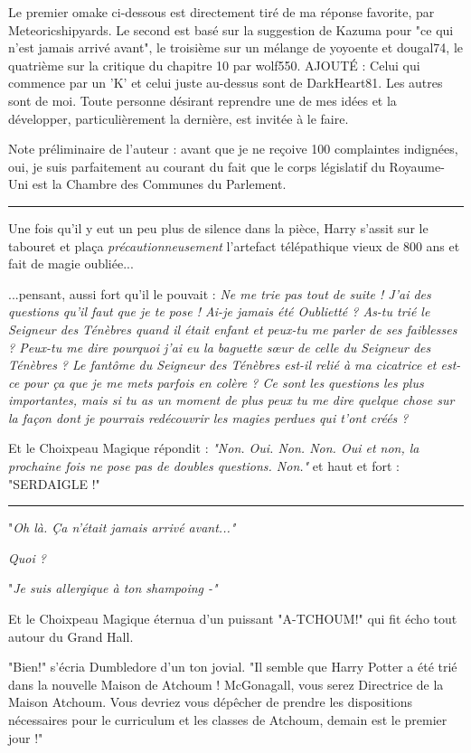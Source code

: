 Le premier omake ci-dessous est directement tiré de ma réponse favorite, par Meteoricshipyards. Le second est basé sur la suggestion de Kazuma pour "ce qui n'est jamais arrivé avant", le troisième sur un mélange de yoyoente et dougal74, le quatrième sur la critique du chapitre 10 par wolf550. AJOUTÉ : Celui qui commence par un 'K' et celui juste au-dessus sont de DarkHeart81. Les autres sont de moi. Toute personne désirant reprendre une de mes idées et la développer, particulièrement la dernière, est invitée à le faire.

Note préliminaire de l'auteur : avant que je ne reçoive 100 complaintes indignées, oui, je suis parfaitement au courant du fait que le corps législatif du Royaume-Uni est la Chambre des Communes du Parlement.
\par\noindent\rule{\textwidth}{0.4pt}
Une fois qu'il y eut un peu plus de silence dans la pièce, Harry s'assit sur le tabouret et plaça \emph{précautionneusement}  l'artefact télépathique vieux de 800 ans et fait de magie oubliée...

...pensant, aussi fort qu'il le pouvait : \emph{Ne me trie pas tout de suite ! J'ai des questions qu'il faut que je te pose ! Ai-je jamais été Oublietté ? As-tu trié le Seigneur des Ténèbres quand il était enfant et peux-tu me parler de ses faiblesses ? Peux-tu me dire pourquoi j'ai eu la baguette sœur de celle du Seigneur des Ténèbres ? Le fantôme du Seigneur des Ténèbres est-il relié à ma cicatrice et est-ce pour ça que je me mets parfois en colère ? Ce sont les questions les plus importantes, mais si tu as un moment de plus peux tu me dire quelque chose sur la façon dont je pourrais redécouvrir les magies perdues qui t'ont créés ?} 

Et le Choixpeau Magique répondit : \emph{"Non. Oui. Non. Non. Oui et non, la prochaine fois ne pose pas de doubles questions. Non." } et haut et fort : "SERDAIGLE !"
\par\noindent\rule{\textwidth}{0.4pt}
"\emph{Oh là. Ça n'était jamais arrivé avant..."} 

\emph{Quoi ?} 

"\emph{Je suis allergique à ton shampoing -"} 

Et le Choixpeau Magique éternua d'un puissant "A-TCHOUM!" qui fit écho tout autour du Grand Hall.

"Bien!" s'écria Dumbledore d'un ton jovial. "Il semble que Harry Potter a été trié dans la nouvelle Maison de Atchoum ! McGonagall, vous serez Directrice de la Maison Atchoum. Vous devriez vous dépêcher de prendre les dispositions nécessaires pour le curriculum et les classes de Atchoum, demain est le premier jour !"


